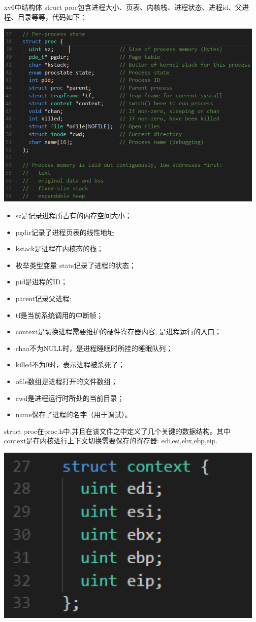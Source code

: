 xv6中结构体 struct proc包含进程大小、页表、内核栈、进程状态、进程id、父进程、目录等等，代码如下：

\includegraphics[width=6in]{figures/process/fig2.png}

\begin{itemize}
\item sz是记录进程所占有的内存空间大小；
\item pgdir记录了进程页表的线性地址
\item kstack是进程在内核态的栈；
\item 枚举类型变量 state记录了进程的状态；
\item pid是进程的ID；
\item parent记录父进程;
\item tf是当前系统调用的中断帧；
\item context是切换进程需要维护的硬件寄存器内容, 是进程运行的入口；
\item chan不为NULL时，是进程睡眠时所挂的睡眠队列；
\item killed不为0时，表示进程被杀死了；
\item ofile数组是进程打开的文件数组；
\item cwd是进程运行时所处的当前目录；
\item name保存了进程的名字（用于调试）。
\end{itemize}

struct proc在proc.h中,并且在该文件之中定义了几个关键的数据结构。其中context是在内核进行上下文切换需要保存的寄存器: edi,esi,ebx,ebp,eip.

\includegraphics[width=6in]{figures/process/fig3.png}

